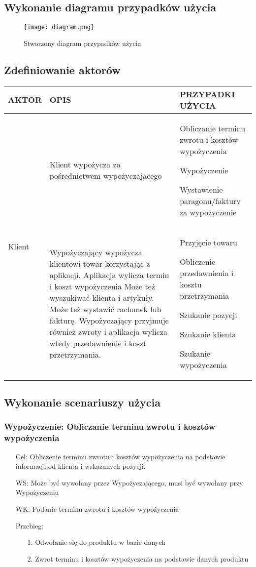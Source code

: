 \documentclass{article}
\begin{document}
	\subsection{Wykonanie diagramu przypadków użycia}
	\begin{figure}[!ht]
	\centering
	\texttt{[image: diagram.png]}
	\caption{Stworzony diagram przypadków użycia}
	\label{fig:obrazek 1}
	\end{figure}
	\subsection{Zdefiniowanie aktorów}
	
\begin{tabular}{| p{} | p{} | p{6cm} |} \hline 
	AKTOR & OPIS & PRZYPADKI UŻYCIA   \\ \hline
	\multirow{3}{*}{Klient} & Klient wypożycza za pośrednictwem wypożyczającego & 
	Obliczanie terminu zwrotu i kosztów wypożyczenia \par
	Wypożyczenie \par
	Wystawienie paragonu/faktury za wypożyczenie \\ 
	\hline
	\multirow{5}{*}{Wypożyczający} & Wypożyczający wypożycza klientowi towar korzystając z aplikacji.  Aplikacja wylicza termin i koszt wypożyczenia Może też wyszukiwać klienta i artykuły. Może też wystawić rachunek lub fakturę. Wypożyczający przyjmuje również zwroty i aplikacja wylicza wtedy przedawnienie i koszt przetrzymania. & Przyjęcie towaru\par
	Obliczenie przedawnienia i kosztu przetrzymania\par
	Szukanie pozycji\par
	Szukanie klienta\par
	Szukanie wypożyczenia \\ \hline
\end{tabular}
\subsection{Wykonanie scenariuszy użycia}	
\subsubsection{Wypożyczenie: Obliczanie terminu zwrotu i kosztów wypożyczenia}
\begin{enumerate}
	\item [Cel:] Obliczenie terminu zwrotu i kosztów wypożyczenia na podstawie informacji od klienta i wskazanych pozycji.
	\item [WS:] Może być wywołany przez Wypożyczającego, musi być wywołany przy Wypożyczeniu
	\item [WK:] Podanie terminu zwrotu i kosztów wypożyczenia
	\item [Przebieg:]
	\begin{enumerate}
	\item [1.]Odwołanie się do produktu w bazie danych
	\item [2.]Zwrot terminu i kosztów wypożyczenia na podstawie danych produktu
	\end{enumerate}
\end{enumerate}
\end{document}
